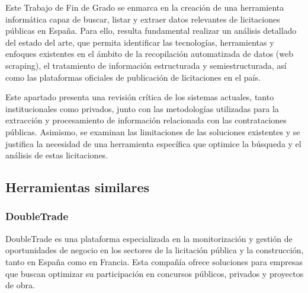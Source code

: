 \documentclass{article}
\begin{document}
Este Trabajo de Fin de Grado se enmarca en la creación de una herramienta informática capaz de buscar, listar y extraer datos relevantes de licitaciones públicas en España. Para ello, resulta fundamental realizar un análisis detallado del estado del arte, que permita identificar las tecnologías, herramientas y enfoques existentes en el ámbito de la recopilación automatizada de datos (web scraping), el tratamiento de información estructurada y semiestructurada, así como las plataformas oficiales de publicación de licitaciones en el país.

Este apartado presenta una revisión crítica de los sistemas actuales, tanto institucionales como privados, junto con las metodologías utilizadas para la extracción y procesamiento de información relacionada con las contrataciones públicas. Asimismo, se examinan las limitaciones de las soluciones existentes y se justifica la necesidad de una herramienta específica que optimice la búsqueda y el análisis de estas licitaciones.

\subsection{Herramientas similares} 
  \subsubsection{DoubleTrade}
  DoubleTrade es una plataforma especializada en la monitorización y gestión de oportunidades de negocio en los sectores de la licitación pública y la construcción, tanto en España como en Francia. Esta compañía ofrece soluciones para empresas que buscan optimizar su participación en concursos públicos, privados y proyectos de obra.
\end{document}
